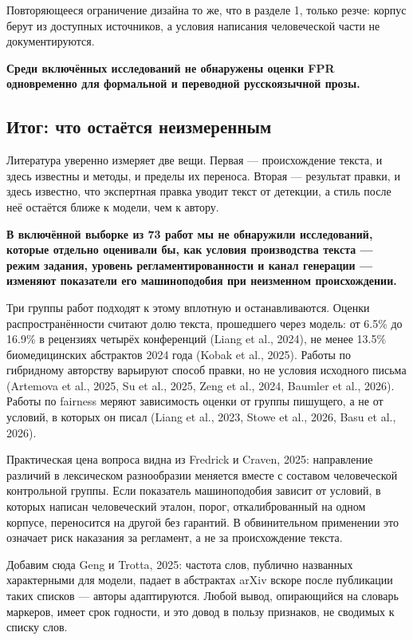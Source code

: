 \documentclass[11pt,a4paper]{article}
\renewcommand{\_}{\textunderscore\allowbreak}
\begin{document}
Повторяющееся ограничение дизайна то же, что в разделе 1, только резче: корпус
берут из доступных источников, а условия написания человеческой части не
документируются.

\textbf{Среди включённых исследований не обнаружены оценки FPR одновременно для
формальной и переводной русскоязычной прозы.}

\subsection{Итог: что остаётся неизмеренным}

Литература уверенно измеряет две вещи. Первая — происхождение текста, и здесь
известны и методы, и пределы их переноса. Вторая — результат правки, и здесь
известно, что экспертная правка уводит текст от детекции, а стиль после неё
остаётся ближе к модели, чем к автору.

\textbf{В включённой выборке из 73 работ мы не обнаружили исследований, которые
отдельно оценивали бы, как условия производства текста — режим задания, уровень
регламентированности и канал генерации — изменяют показатели его машиноподобия
при неизменном происхождении.}

Три группы работ подходят к этому вплотную и останавливаются. Оценки
распространённости считают долю текста, прошедшего через модель: от 6.5\% до 16.9\%
в рецензиях четырёх конференций (Liang et al., 2024), не менее 13.5\% биомедицинских абстрактов
2024 года (Kobak et al., 2025). Работы по гибридному авторству варьируют способ правки, но не
условия исходного письма (Artemova et al., 2025, Su et al., 2025, Zeng et al., 2024, Baumler et al., 2026). Работы по fairness меряют
зависимость оценки от группы пишущего, а не от условий, в которых он писал (Liang et al., 2023,
Stowe et al., 2026, Basu et al., 2026).

Практическая цена вопроса видна из Fredrick и Craven, 2025: направление различий в лексическом
разнообразии меняется вместе с составом человеческой контрольной группы. Если
показатель машиноподобия зависит от условий, в которых написан человеческий
эталон, порог, откалиброванный на одном корпусе, переносится на другой без
гарантий. В обвинительном применении это означает риск наказания за регламент, а
не за происхождение текста.

Добавим сюда Geng и Trotta, 2025: частота слов, публично названных характерными для модели,
падает в абстрактах arXiv вскоре после публикации таких списков — авторы
адаптируются. Любой вывод, опирающийся на словарь маркеров, имеет срок годности,
и это довод в пользу признаков, не сводимых к списку слов.
\end{document}
